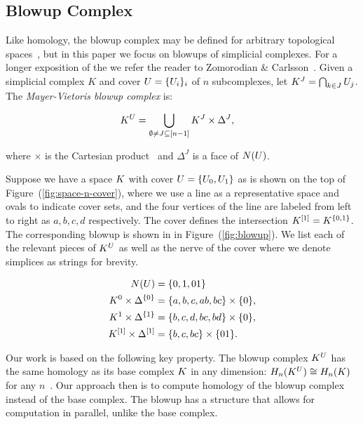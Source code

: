 \documentclass{elsarticle}
\begin{document}
\subsection{Blowup Complex}

Like homology, the blowup complex may be defined for arbitrary topological 
spaces~\cite{zc-lh-08}, but in this paper we focus on blowups of simplicial 
complexes. For a longer exposition of the \mvb{} we refer the reader to Zomorodian
\& Carlsson~\cite{zc-lh-08}. Given a simplicial complex $K$ and cover 
$U = \{U_i\}_i$ of $n$ subcomplexes, let 
$K^J = \bigcap_{k \in J} U_j$. The \emph{Mayer-Vietoris blowup complex} is:
\begin{linenomath*}
\begin{align*}
K^U &= \bigcup_{\emptyset \not = J \subseteq [n-1]} K^J \times \Delta^J,
\end{align*}
\end{linenomath*}
where $\times$ is the Cartesian product~\cite{zc-lh-08} and $\Delta^J$ is a face of $N(U)$.
\begin{example}
\label{ex:blowup}
Suppose we have a space $K$ with cover $U = \{ U_0, U_1 \}$ as is shown on 
the top of Figure~(\ref{fig:space-n-cover}), where we use a line as a 
representative space and ovals to indicate cover sets, and the four vertices
of the line are labeled from left to right as $a, b, c, d$ respectively.
The cover defines the intersection $K^{[1]} = K^{ \{ 0 , 1 \} }$. 
The corresponding blowup is shown in in Figure~(\ref{fig:blowup}). We list each of
the relevant pieces of $K^{U}$ as well as the nerve of the cover where we denote simplices as strings for 
brevity.  
\begin{linenomath*}
\begin{align*}
N(U) &= \{ 0, 1, 01 \} \\
K^0 \times \Delta^{\{0\}} &= \{a,b,c,ab,bc\} \times \{0\}, \\
K^1 \times \Delta^{\{1\}} &= \{b,c,d,bc,bd\} \times \{0\}, \\
K^{[1]} \times \Delta^{[1]} &=\{b,c,bc\} \times \{01\}. 
\end{align*}
\end{linenomath*}
\end{example}
Our work is based on the following key property.
The blowup complex $K^U$ has the same homology as its base complex $K$ in any 
dimension: $H_n(K^U) \cong H_n(K)$ for any $n$~\cite[Lemma 1]{zc-lh-08}. 
Our approach then is to compute homology of the blowup complex 
instead of the base complex. The blowup has a structure that allows 
for computation in parallel, unlike the base complex.
\end{document}
